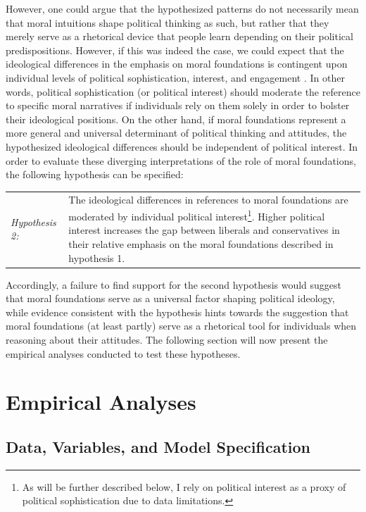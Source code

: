 \documentclass[12pt]{paper}
\begin{document}
However, one could argue that the hypothesized patterns do not necessarily mean that moral intuitions shape political thinking as such, but rather that they merely serve as a rhetorical device that people learn depending on their political predispositions. However, if this was indeed the case, we could expect that the ideological differences in the emphasis on moral foundations is contingent upon individual levels of political sophistication, interest, and engagement \citep[see also][]{goren2001core,goren2004political}. In other words, political sophistication (or political interest) should moderate the reference to specific moral narratives if individuals rely on them solely in order to bolster their ideological positions. On the other hand, if moral foundations represent a more general and universal determinant of political thinking and attitudes, the hypothesized ideological differences should be independent of political interest. In order to evaluate these diverging interpretations of the role of moral foundations, the following hypothesis can be specified:

\vspace{0.3cm}
\begin{tabular}{lp{12cm}}
\textsl{Hypothesis 2:} & The ideological differences in references to moral foundations are moderated by individual political interest\footnote{As will be further described below, I rely on political interest as a proxy of political sophistication due to data limitations.}. Higher political interest increases the gap between liberals and conservatives in their relative emphasis on the moral foundations described in hypothesis 1.
\end{tabular}
\vspace{0.5cm}

Accordingly, a failure to find support for the second hypothesis would suggest that moral foundations serve as a universal factor shaping political ideology, while evidence consistent with the hypothesis hints towards the suggestion that moral foundations (at least partly) serve as a rhetorical tool for individuals when reasoning about their attitudes. The following section will now present the empirical analyses conducted to test these hypotheses.


\section{Empirical Analyses}

\subsection{Data, Variables, and Model Specification}
\end{document}
